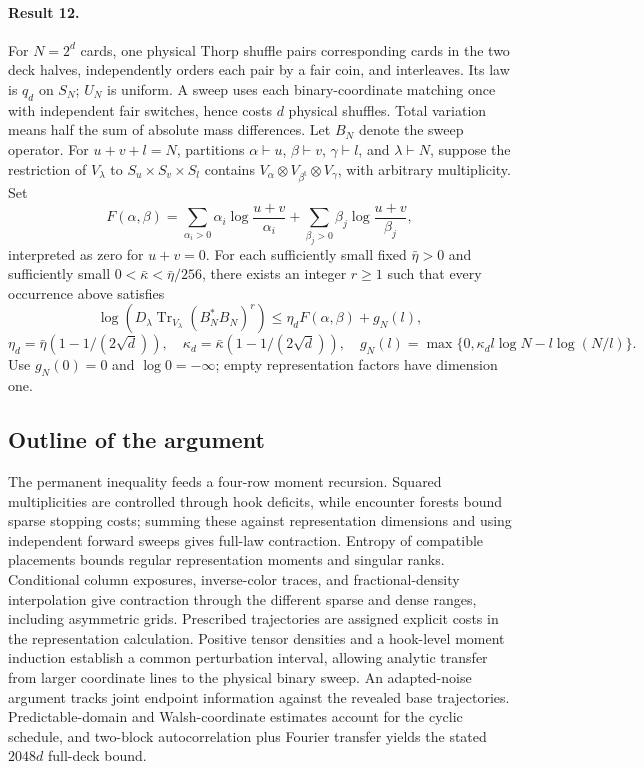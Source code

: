 \documentclass[11pt]{article}
\begin{document}
\paragraph{Result 12.} For $N=2^d$ cards, one physical Thorp shuffle pairs corresponding cards in the two deck halves, independently orders each pair by a fair coin, and interleaves. Its law is $q_d$ on $S_N$; $U_N$ is uniform. A sweep uses each binary-coordinate matching once with independent fair switches, hence costs $d$ physical shuffles. Total variation means half the sum of absolute mass differences. Let $B_N$ denote the sweep operator. For $u+v+l=N$, partitions $\alpha\vdash u$, $\beta\vdash v$, $\gamma\vdash l$, and $\lambda\vdash N$, suppose the restriction of $V_\lambda$ to $S_u\times S_v\times S_l$ contains $V_\alpha\otimes V_{\beta^{\mathrm t}}\otimes V_\gamma$, with arbitrary multiplicity. Set
\[
 F(\alpha,\beta)=\sum_{\alpha_i>0}\alpha_i\log\frac{u+v}{\alpha_i}
 +\sum_{\beta_j>0}\beta_j\log\frac{u+v}{\beta_j},
\]
interpreted as zero for $u+v=0$. For each sufficiently small fixed $\bar\eta>0$ and sufficiently small $0<\bar\kappa<\bar\eta/256$, there exists an integer $r\ge1$ such that every occurrence above satisfies
\[
 \log\left(D_\lambda\operatorname{Tr}_{V_\lambda}(B_N^*B_N)^r\right)
 \le\eta_dF(\alpha,\beta)+g_N(l),
\]
\[
 \eta_d=\bar\eta(1-1/(2\sqrt d)),\quad\kappa_d=\bar\kappa(1-1/(2\sqrt d)),\quad
 g_N(l)=\max\{0,\kappa_dl\log N-l\log(N/l)\}.
\]
Use $g_N(0)=0$ and $\log0=-\infty$; empty representation factors have dimension one.

\subsection{Outline of the argument}
The permanent inequality feeds a four-row moment recursion. Squared multiplicities are controlled through hook deficits, while encounter forests bound sparse stopping costs; summing these against representation dimensions and using independent forward sweeps gives full-law contraction. Entropy of compatible placements bounds regular representation moments and singular ranks. Conditional column exposures, inverse-color traces, and fractional-density interpolation give contraction through the different sparse and dense ranges, including asymmetric grids. Prescribed trajectories are assigned explicit costs in the representation calculation. Positive tensor densities and a hook-level moment induction establish a common perturbation interval, allowing analytic transfer from larger coordinate lines to the physical binary sweep. An adapted-noise argument tracks joint endpoint information against the revealed base trajectories. Predictable-domain and Walsh-coordinate estimates account for the cyclic schedule, and two-block autocorrelation plus Fourier transfer yields the stated $2048d$ full-deck bound.
\end{document}
